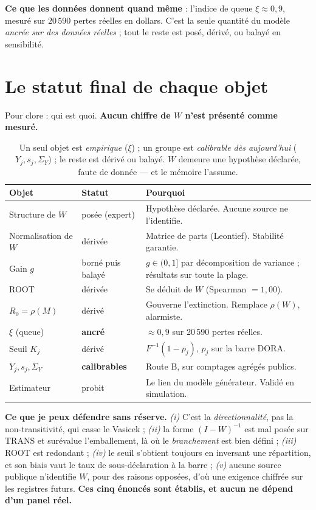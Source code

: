 \documentclass[11pt,a4paper]{article}
\newcommand{\Y}{Y}
\begin{document}
\noindent \textbf{Ce que les données donnent quand même} : l'indice de queue $\xi\approx 0{,}9$,
mesuré sur $20\,590$ pertes réelles en dollars. C'est la seule quantité du modèle \emph{ancrée
sur des données réelles} ; tout le reste est posé, dérivé, ou balayé en sensibilité.

\section{Le statut final de chaque objet}

Pour clore : qui est quoi. \textbf{Aucun chiffre de $W$ n'est présenté comme mesuré.}

\begin{table}[htbp]\centering\small
\renewcommand{\arraystretch}{1.3}
\begin{tabularx}{\textwidth}{@{}>{\raggedright\arraybackslash}p{3.2cm} >{\raggedright\arraybackslash}p{2.6cm} >{\raggedright\arraybackslash}X@{}}
\toprule
\textbf{Objet} & \textbf{Statut} & \textbf{Pourquoi} \\
\midrule
Structure de $W$ & posée (expert) & Hypothèse déclarée. Aucune source ne l'identifie. \\
Normalisation de $W$ & dérivée & Matrice de parts (Leontief). Stabilité garantie. \\
Gain $g$ & borné puis balayé & $g\in(0,1]$ par décomposition de variance ; résultats sur toute la plage. \\
ROOT & dérivée & Se déduit de $W$ (Spearman $=1{,}00$). \\
$R_0=\rho(M)$ & dérivé & Gouverne l'extinction. Remplace $\rho(W)$, alarmiste. \\
$\xi$ (queue) & \textbf{ancré} & $\approx 0{,}9$ sur 20\,590 pertes réelles. \\
Seuil $K_j$ & dérivé & $F^{-1}(1-p_j)$, $p_j$ sur la barre DORA. \\
$\Y_j,s_j,\Sigma_Y$ & \textbf{calibrables} & Route B, sur comptages agrégés publics. \\
Estimateur & probit & Le lien du modèle générateur. Validé en simulation. \\
\bottomrule
\end{tabularx}
\caption{Un seul objet est \emph{empirique} ($\xi$) ; un groupe est \emph{calibrable dès
aujourd'hui} ($\Y_j,s_j,\Sigma_Y$) ; le reste est dérivé ou balayé. $W$ demeure une hypothèse
déclarée, faute de donnée --- et le mémoire l'assume.}
\end{table}

\begin{cle}
\textbf{Ce que je peux défendre sans réserve.} \emph{(i)} C'est la \emph{directionnalité}, pas
la non-transitivité, qui casse le Vasicek ; \emph{(ii)} la forme $(I-W)^{-1}$ est mal posée sur
TRANS et surévalue l'emballement, là où le \emph{branchement} est bien défini ; \emph{(iii)}
ROOT est redondant ; \emph{(iv)} le seuil s'obtient toujours en inversant une répartition, et
son biais vaut le taux de sous-déclaration à la barre ; \emph{(v)} aucune source publique
n'identifie $W$, pour des raisons opposées, d'où une exigence chiffrée sur les registres futurs.
\textbf{Ces cinq énoncés sont établis, et aucun ne dépend d'un panel réel.}
\end{cle}
\end{document}
